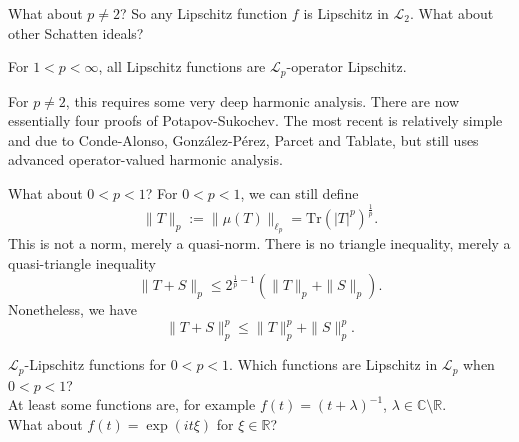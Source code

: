 \documentclass{beamer}
\numberwithin{equation}{section}
\theoremstyle{plain}
\theoremstyle{plain}
\theoremstyle{definition}
\theoremstyle{plain}
\theoremstyle{plain}
\theoremstyle{definition}
\newcommand{\Rl}{\mathbb{R}}
\newcommand{\Cplx}{\mathbb{C}}
\newcommand{\Lc}{\mathcal{L}}
\newcommand{\Tr}{\mathrm{Tr}}
\begin{document}
\begin{frame}{What about $p\neq 2$?}
    So any Lipschitz function $f$ is Lipschitz in $\Lc_2.$ What about other Schatten ideals?
    \begin{theorem}
        For $1 < p < \infty$, all Lipschitz functions are $\Lc_p$-operator Lipschitz.
    \end{theorem}
    \pause
    For $p\neq 2$, this requires some very deep harmonic analysis. \pause
    There are now essentially four proofs of Potapov-Sukochev. The most recent is relatively simple and due to
    Conde-Alonso, Gonz\'alez-P\'erez, Parcet and Tablate, but still uses advanced operator-valued harmonic analysis.
\end{frame}



\begin{frame}{What about $0 < p < 1$?}
    For $0 < p < 1$, we can still define
    $$
        \|T\|_p := \|\mu(T)\|_{\ell_p} = \Tr(|T|^p)^{\frac1p}.
    $$
    This is not a norm, merely a quasi-norm. There is no triangle inequality, merely a quasi-triangle inequality
    $$
        \|T+S\|_p \leq 2^{\frac1p-1}(\|T\|_p+\|S\|_p).
    $$
    \pause
    Nonetheless, we have
    \[
        \|T+S\|_p^p \leq \|T\|_p^p+\|S\|_p^p.
    \]
\end{frame}

%
%
%

\begin{frame}{$\Lc_p$-Lipschitz functions for $0 < p < 1.$}
    Which functions are Lipschitz in $\Lc_p$ when $0 < p < 1$? \\
    \pause
    At least some functions are, for example $f(t) = (t+\lambda)^{-1}$, $\lambda \in \Cplx\setminus \Rl.$\\
    \pause
    What about $f(t) = \exp(it\xi)$ for $\xi\in \Rl$?
\end{frame}
\end{document}
